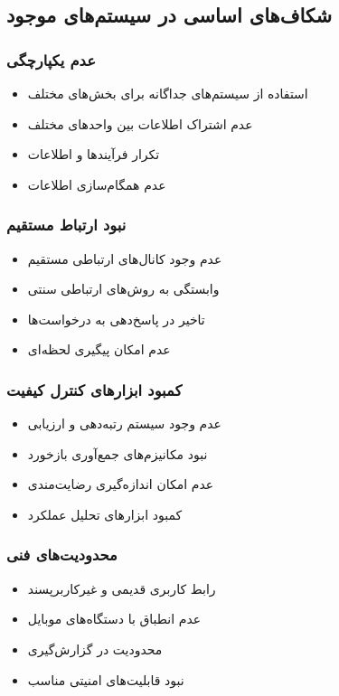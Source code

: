 \documentclass[12pt,a4paper]{report}
\begin{document}
	\subsection{شکاف‌های اساسی در سیستم‌های موجود}
	
	\subsubsection{عدم یکپارچگی}
	\begin{itemize}
		\item استفاده از سیستم‌های جداگانه برای بخش‌های مختلف
		\item عدم اشتراک اطلاعات بین واحدهای مختلف
		\item تکرار فرآیندها و اطلاعات
		\item عدم همگام‌سازی اطلاعات
	\end{itemize}
	
	\subsubsection{نبود ارتباط مستقیم}
	\begin{itemize}
		\item عدم وجود کانال‌های ارتباطی مستقیم
		\item وابستگی به روش‌های ارتباطی سنتی
		\item تاخیر در پاسخ‌دهی به درخواست‌ها
		\item عدم امکان پیگیری لحظه‌ای
	\end{itemize}
	
	\subsubsection{کمبود ابزارهای کنترل کیفیت}
	\begin{itemize}
		\item عدم وجود سیستم رتبه‌دهی و ارزیابی
		\item نبود مکانیزم‌های جمع‌آوری بازخورد
		\item عدم امکان اندازه‌گیری رضایت‌مندی
		\item کمبود ابزارهای تحلیل عملکرد
	\end{itemize}
	
	\subsubsection{محدودیت‌های فنی}
	\begin{itemize}
		\item رابط کاربری قدیمی و غیرکاربرپسند
		\item عدم انطباق با دستگاه‌های موبایل
		\item محدودیت در گزارش‌گیری
		\item نبود قابلیت‌های امنیتی مناسب
	\end{itemize}
	
\end{document}
